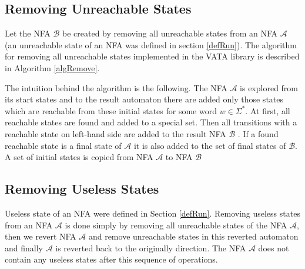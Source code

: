 \subsection{Removing Unreachable States}
Let the NFA $\mathcal{B}$ be created by removing all unreachable states from an NFA $\mathcal{A}$ (an unreachable state of an NFA was defined in
section \ref{defRun}). The algorithm for removing all unreachable states implemented in the VATA library is described in Algorithm \ref{algRemove}.

The intuition behind the algorithm is the following. The NFA $\mathcal{A}$ is explored from its start states and to the result automaton 
there are added only those states which are
reachable from these initial states for some word $w \in \Sigma^{*}$. At first, all reachable states are found and added to a special set. 
Then all transitions with a reachable state on left-hand side are added to the result NFA $\mathcal{B}$ .
If a found reachable state is a final state of 
$\mathcal{A}$ it is also added to the set of final states of $\mathcal{B}$. A set of initial states is copied from
NFA $\mathcal{A}$ to NFA $\mathcal{B}$

\subsection{Removing Useless States}
Useless state of an NFA were defined in Section \ref{defRun}. Removing useless states from an NFA $\mathcal{A}$ is done simply by
removing all unreachable states of the NFA $\mathcal{A}$, 
then we revert NFA $\mathcal{A}$ and remove unreachable states in this reverted automaton and finally $\mathcal{A}$ is reverted back to the
originally direction. The NFA $\mathcal{A}$ does not contain any useless states after this sequence of operations.

